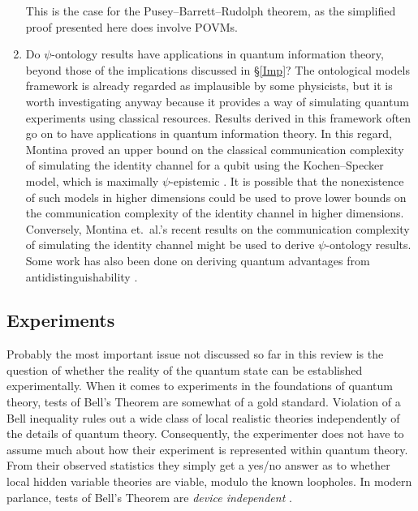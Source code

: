 \documentclass[DIV=calc,fontsize=12pt]{scrartcl} %
\theoremstyle{definition}
\theoremstyle{plain}
\begin{document}
\begin{enumerate}
This is the case for the Pusey--Barrett--Rudolph theorem, as the simplified proof
presented here does involve POVMs.
\item Do $\psi$-ontology results have applications in quantum
information theory, beyond those of the implications discussed in
\S\ref{Imp}?  The ontological models framework is already regarded
as implausible by some physicists, but it is worth investigating
anyway because it provides a way of simulating quantum experiments
using classical resources.  Results derived in this framework often
go on to have applications in quantum information theory.  In this
regard, Montina proved an upper bound on the classical communication
complexity of simulating the identity channel for a qubit using the
Kochen--Specker model, which is maximally $\psi$-epistemic
\cite{Montina2012}.  It is possible that the nonexistence of such
models in higher dimensions could be used to prove lower bounds on
the communication complexity of the identity channel in higher
dimensions.  Conversely, Montina et.\ al.'s recent results on the
communication complexity of simulating the identity channel
\cite{Montina2011a, Montina2013, Montina2014, Montina2014a} might be
used to derive $\psi$-ontology results.  Some work has also been
done on deriving quantum advantages from antidistinguishability
\cite{Bandyopadhyay2013, Perry2014}.
\end{enumerate}

\subsection{Experiments}

\label{Conc:Exp}

Probably the most important issue not discussed so far in this review
is the question of whether the reality of the quantum state can be
established experimentally.  When it comes to experiments in the
foundations of quantum theory, tests of Bell's Theorem are somewhat of
a gold standard.  Violation of a Bell inequality rules out a wide
class of local realistic theories independently of the details of
quantum theory.  Consequently, the experimenter does not have to
assume much about how their experiment is represented within quantum
theory.  From their observed statistics they simply get a yes/no
answer as to whether local hidden variable theories are viable, modulo
the known loopholes.  In modern parlance, tests of Bell's Theorem are
\emph{device independent} \cite{Brunner2013}.
\end{document}
